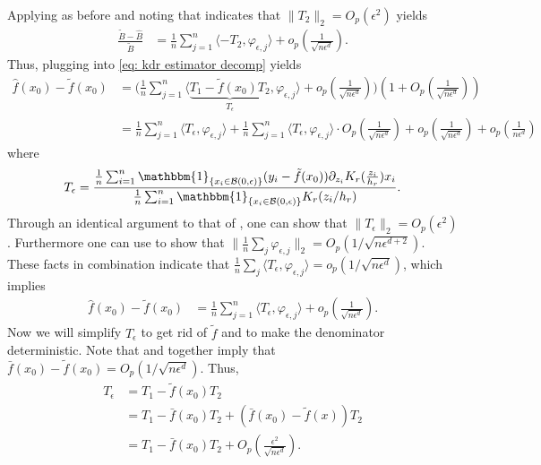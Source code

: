 \documentclass[11pt]{article}
\begin{document}
Applying  as before and noting that  indicates that $\|T_2\|_2 = O_p(\epsilon^2)$ yields 
\begin{align*}
    \frac{\tilde{B} - \widehat{B}}{\tilde{B}} &= \frac{1}{n}\sum_{j = 1}^n\langle-T_{2}, \varphi_{\epsilon, j}\rangle + o_p\left(\frac{1}{\sqrt{n\epsilon^{d}}}\right).
\end{align*}
Thus, plugging into \cref{eq: kdr estimator decomp} yields
\begin{align*}
    \hat{f}(x_0) - \tilde{f}(x_0) &= \bigg(\frac{1}{n}\sum_{j = 1}^n\Big\langle\underbrace{ T_{1}-\tilde{f}(x_0)T_{2}}_{T_{\epsilon}}, \varphi_{\epsilon, j}\Big\rangle +  o_p\left(\frac{1}{\sqrt{n\epsilon^{d}}}\right)\bigg)\left(1  + O_p\left(\frac{1}{\sqrt{n\epsilon^d}}\right)\right) \\
    &= \frac{1}{n}\sum_{j = 1}^n\langle T_{\epsilon}, \varphi_{\epsilon, j}\rangle + \frac{1}{n}\sum_{j = 1}^n\langle T_{\epsilon}, \varphi_{\epsilon, j}\rangle \cdot O_p\left(\frac{1}{\sqrt{n\epsilon^d}}\right) + o_p\left(\frac{1}{\sqrt{n\epsilon^{d}}} \right) + o_p\left(\frac{1}{n\epsilon^{d}}\right)
\end{align*}
where
\begin{equation*}
    T_{\epsilon} = \frac{\frac{1}{n}\sum_{i = 1}^n\mathbbm{1}_{\{x_i \in \mathcal{B}(0, \epsilon)\}}(y_i - \tilde{f}(x_0))\partial_{z_i}K_r(\frac{z_i}{h_r})x_i}{\frac{1}{n}\sum_{i = 1}^n\mathbbm{1}_{\{x_i \in \mathcal{B}(0, \epsilon)\}}K_r(z_i/h_r)}.
\end{equation*}
Through an identical argument to that of , one can show that $\|T_{\epsilon}\|_2 = O_p(\epsilon^2)$. Furthermore one can use  to show that $\|\frac{1}{n}\sum_j\varphi_{\epsilon,j}\|_2 = O_p(1/\sqrt{n\epsilon^{d+2}})$. These facts in combination indicate that $\frac{1}{n}\sum_j\langle T_{\epsilon}, \varphi_{\epsilon,j}\rangle = o_p(1/\sqrt{n\epsilon^d})$, which implies
\begin{align*}
    \hat{f}(x_0) - \tilde{f}(x_0) &= \frac{1}{n}\sum_{j = 1}^n\langle T_{\epsilon}, \varphi_{\epsilon,j }\rangle + o_p\left(\frac{1}{\sqrt{n\epsilon^{d}}} \right).
\end{align*}
Now we will simplify $T_{\epsilon}$ to get rid of $\tilde{f}$ and to make the denominator deterministic. Note that  and  together imply that $\bar{f}(x_0) - \tilde f(x_0) = O_p(1/\sqrt{n\epsilon^{d}})$. Thus,
\begin{align*}
    T_{\epsilon} &= T_1 - \tilde{f}(x_0)T_2 \\
    &= T_1 - \bar{f}(x_0)T_2 + (\bar{f}(x_0) - \tilde{f}(x))T_2 \\
    &= T_1 - \bar{f}(x_0)T_2 + O_p\left(\frac{\epsilon^2}{\sqrt{n\epsilon^d}}\right).
\end{align*}
\end{document}
